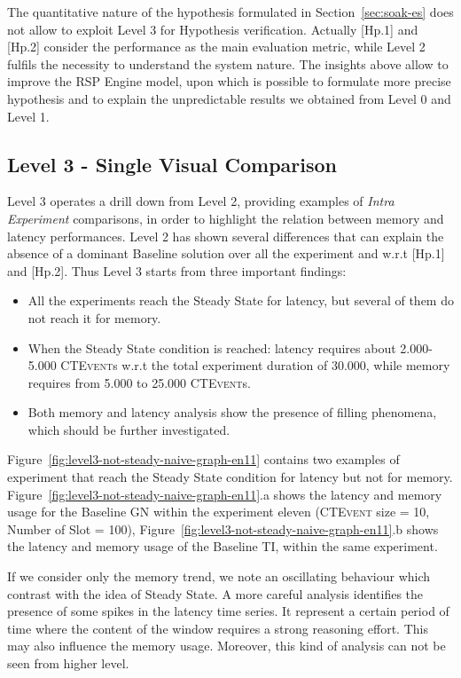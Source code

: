 The quantitative nature of the hypothesis formulated in Section~\ref{sec:soak-es} does not allow to exploit Level 3 for Hypothesis verification. Actually [Hp.1] and [Hp.2] consider the performance as the main evaluation metric, while Level 2 fulfils the necessity to understand the system nature. The insights above allow to improve the RSP Engine model, upon which is possible to formulate more precise hypothesis and to explain the unpredictable results we obtained from Level 0 and Level 1.

\subsection{Level 3 - Single Visual Comparison}\label{sec:eval-level3}
	
Level 3 operates a drill down from Level 2, providing examples of \textit{Intra Experiment} comparisons, in order to highlight the relation between memory and latency performances. Level 2 has shown several differences that can explain the absence of a dominant Baseline solution over all the experiment and w.r.t [Hp.1] and [Hp.2]. Thus Level 3 starts from three important findings:
\begin{itemize}
\item All the experiments reach the Steady State for latency, but several of them do not reach it for memory.
\item When the Steady State condition is reached: latency requires about 2.000-5.000 \textsc{CTEvent}s w.r.t the total experiment duration of 30.000, while memory requires from 5.000 to 25.000 \textsc{CTEvent}s.
\item Both memory and latency analysis show the presence of filling phenomena, which should be further investigated.
\end{itemize}

Figure~\ref{fig:level3-not-steady-naive-graph-en11} contains two examples of experiment that reach the Steady State condition for latency but not for memory. Figure~\ref{fig:level3-not-steady-naive-graph-en11}.a shows the latency and memory usage for the Baseline GN within the experiment eleven (\textsc{CTEvent} size = 10, Number of Slot = 100), Figure~\ref{fig:level3-not-steady-naive-graph-en11}.b shows the latency and memory usage of the Baseline TI, within the same experiment. 

If we consider only the memory trend, we note an oscillating behaviour which contrast with the idea of Steady State. A more careful analysis identifies the presence of some spikes in the latency time series. It represent a certain period of time where the content of the window requires a strong reasoning effort. This may also influence the memory usage. Moreover, this kind of analysis can not be seen from higher level. 

